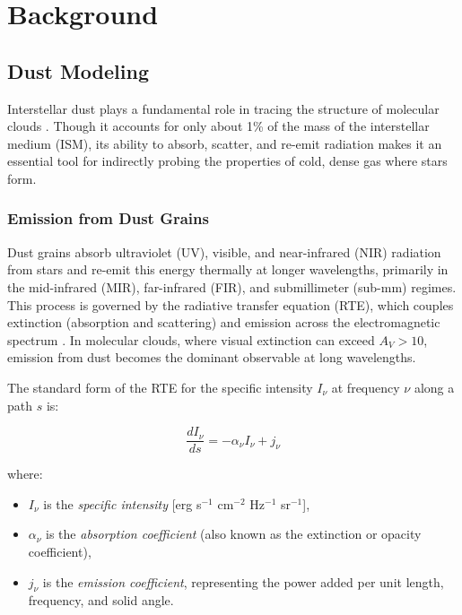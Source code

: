 \chapter{Background}
\label{chap:background}

\section{Dust Modeling}

Interstellar dust plays a fundamental role in tracing the structure of molecular clouds \cite{mckee2007theory}. Though it accounts for only about 1\% of the mass of the interstellar medium (ISM), its ability to absorb, scatter, and re-emit radiation makes it an essential tool for indirectly probing the properties of cold, dense gas where stars form.

\subsection{Emission from Dust Grains}

Dust grains absorb ultraviolet (UV), visible, and near-infrared (NIR) radiation from stars and re-emit this energy thermally at longer wavelengths, primarily in the mid-infrared (MIR), far-infrared (FIR), and submillimeter (sub-mm) regimes. This process is governed by the radiative transfer equation (RTE), which couples extinction (absorption and scattering) and emission across the electromagnetic spectrum \cite{rybicki1979radiative}. In molecular clouds, where visual extinction can exceed $A_V > 10$, emission from dust becomes the dominant observable at long wavelengths.

The standard form of the RTE for the specific intensity \( I_\nu \) at frequency \( \nu \) along a path \( s \) is:

\begin{equation}
\frac{dI_\nu}{ds} = -\alpha_\nu I_\nu + j_\nu
\end{equation}

where:

\begin{itemize}
    \item \( I_\nu \) is the \textit{specific intensity} [erg s\(^{-1}\) cm\(^{-2}\) Hz\(^{-1}\) sr\(^{-1}\)],
    \item \( \alpha_\nu \) is the \textit{absorption coefficient} (also known as the extinction or opacity coefficient),
    \item \( j_\nu \) is the \textit{emission coefficient}, representing the power added per unit length, frequency, and solid angle.
\end{itemize}

